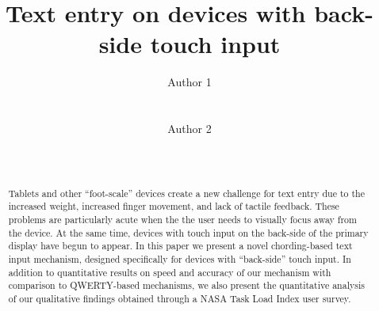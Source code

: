 \documentclass{chi2011}
\begin{document}
\setlength{\paperheight}{11in}
\setlength{\paperwidth}{8.5in}
\setlength{\pdfpageheight}{\paperheight}
\setlength{\pdfpagewidth}{\paperwidth}


\title{Text entry on devices with back-side touch input}
\author{
  \alignauthor Author 1\\
    \\
    \\
  \alignauthor Author 2\\
    \\
    \\
}

\maketitle

\begin{abstract}
  Tablets and other ``foot-scale'' devices create a new challenge for
  text entry due to the increased weight, increased finger movement,
  and lack of tactile feedback.  These problems are particularly acute
  when the the user needs to visually focus away from the device. At
  the same time, devices with touch input on the back-side of the
  primary display have begun to appear.  In this paper we present a
  novel chording-based text input mechanism, designed specifically for
  devices with ``back-side'' touch input.  In addition to quantitative
  results on speed and accuracy of our mechanism with comparison to
  QWERTY-based mechanisms, we also present the quantitative analysis
  of our qualitative findings obtained through a NASA Task Load Index
  user survey.
\end{abstract}







%


\end{document}
